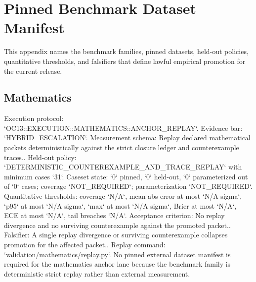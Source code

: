 \section{Pinned Benchmark Dataset Manifest}
\label{sec:oc-core-1-3-domain-benchmark-manifest}

This appendix names the benchmark families, pinned datasets, held-out policies, quantitative thresholds, and falsifiers that define lawful empirical promotion for the current release.

\subsection{Mathematics}
Execution protocol: `OC13::EXECUTION::MATHEMATICS::ANCHOR\_REPLAY`. Evidence bar: `HYBRID\_ESCALATION`.
Measurement schema: Replay declared mathematical packets deterministically against the strict closure ledger and counterexample traces..
Held-out policy: `DETERMINISTIC\_COUNTEREXAMPLE\_AND\_TRACE\_REPLAY` with minimum cases `31`.
Caseset state: `0` pinned, `0` held-out, `0` parameterized out of `0` cases; coverage `NOT\_REQUIRED`; parameterization `NOT\_REQUIRED`.
Quantitative thresholds: coverage `N/A`, mean abs error at most `N/A sigma`, `p95` at most `N/A sigma`, `max` at most `N/A sigma`, Brier at most `N/A`, ECE at most `N/A`, tail breaches `N/A`.
Acceptance criterion: No replay divergence and no surviving counterexample against the promoted packet..
Falsifier: A single replay divergence or surviving counterexample collapses promotion for the affected packet..
Replay command: `validation/mathematics/replay.py`.
No pinned external dataset manifest is required for the mathematics anchor lane because the benchmark family is deterministic strict replay rather than external measurement.

